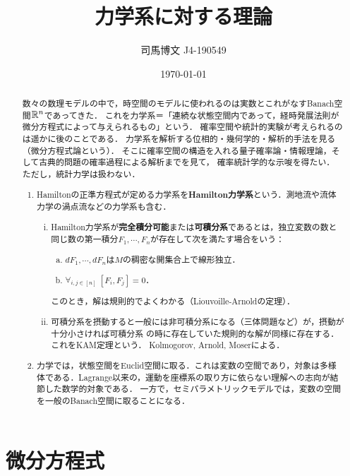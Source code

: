 \documentclass[uplatex, dvipdfmx]{jsreport}
\title{力学系に対する理論}
\author{司馬博文 J4-190549}
\date{\today}
\begin{document}
\tableofcontents

\begin{abstract}
    数々の数理モデルの中で，時空間のモデルに使われるのは実数とこれがなすBanach空間$\mathbb{R}^n$であってきた．
    これを力学系＝「連続な状態空間内であって，経時発展法則が微分方程式によって与えられるもの」という．
    確率空間や統計的実験が考えられるのは遥かに後のことである．
    力学系を解析する位相的・幾何学的・解析的手法を見る（微分方程式論という）．
    そこに確率空間の構造を入れる量子確率論・情報理論，そして古典的問題の確率過程による解析までを見て，
    確率統計学的な示唆を得たい．
    ただし，統計力学は扱わない．
    \begin{enumerate}
        \item Hamiltonの正準方程式が定める力学系を\textbf{Hamilton力学系}という．測地流や流体力学の渦点流などの力学系も含む．
        \begin{enumerate}[(i)]
            \item Hamilton力学系が\textbf{完全積分可能}または\textbf{可積分系}であるとは，独立変数の数と同じ数の第一積分$F_1,\cdots,F_n$が存在して次を満たす場合をいう：
            \begin{enumerate}[(a)]
                \item $dF_1,\cdots,dF_n$は$M$の稠密な開集合上で線形独立．
                \item $\forall_{i,j\in[n]}\;[F_i,F_j]=0$．
            \end{enumerate}
            このとき，解は規則的でよくわかる（Liouvoille-Arnoldの定理）．
            \item 可積分系を摂動すると一般には非可積分系になる（三体問題など）が，摂動が十分小さければ可積分系
            の時に存在していた規則的な解が同様に存在する．
            これをKAM定理という．
            Kolmogorov, Arnold, Moserによる．
        \end{enumerate}
        \item 力学では，状態空間をEuclid空間に取る．これは変数の空間であり，対象は多様体である．Lagrange以来の，運動を座標系の取り方に依らない理解への志向が結節した数学的対象である．
        一方で，セミパラメトリックモデルでは，変数の空間を一般のBanach空間に取ることになる．
    \end{enumerate}
\end{abstract}

\chapter{微分方程式}
\end{document}
